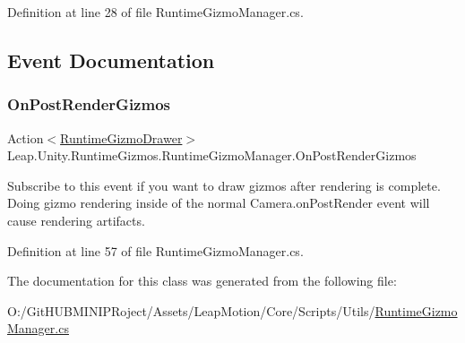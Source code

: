 Definition at line 28 of file Runtime\+Gizmo\+Manager.\+cs.



\subsection{Event Documentation}
\mbox{\label{class_leap_1_1_unity_1_1_runtime_gizmos_1_1_runtime_gizmo_manager_a604c94ac5df754c6b7c7edbbedb8c004}} 
\subsubsection{\texorpdfstring{OnPostRenderGizmos}{OnPostRenderGizmos}}
{\footnotesize\ttfamily Action$<$\mbox{\hyperlink{class_leap_1_1_unity_1_1_runtime_gizmos_1_1_runtime_gizmo_drawer}{Runtime\+Gizmo\+Drawer}}$>$ Leap.\+Unity.\+Runtime\+Gizmos.\+Runtime\+Gizmo\+Manager.\+On\+Post\+Render\+Gizmos\hspace{0.3cm}{\ttfamily [static]}}



Subscribe to this event if you want to draw gizmos after rendering is complete. Doing gizmo rendering inside of the normal Camera.\+on\+Post\+Render event will cause rendering artifacts. 



Definition at line 57 of file Runtime\+Gizmo\+Manager.\+cs.



The documentation for this class was generated from the following file\+:\begin{DoxyCompactItemize}
\item 
O\+:/\+Git\+H\+U\+B\+M\+I\+N\+I\+P\+Roject/\+Assets/\+Leap\+Motion/\+Core/\+Scripts/\+Utils/\mbox{\hyperlink{_runtime_gizmo_manager_8cs}{Runtime\+Gizmo\+Manager.\+cs}}\end{DoxyCompactItemize}
